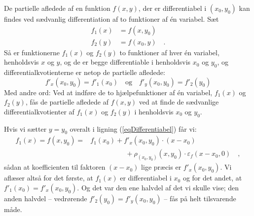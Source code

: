 \begin{theorem}
De partielle afledede af en funktion $f(x,y)$, der er differentiabel i $(x_{0}, y_{0})$ kan findes ved sædvanlig differentiation af to funktioner af \'{e}n variabel. Sæt
\begin{equation}
\begin{aligned}
f_{1}(x) &= f(x, y_{0}) \\
f_{2}(y) &= f(x_{0}, y) \quad.
\end{aligned}
\end{equation}
Så er funktionerne $f_{1}(x)$ og $f_{2}(y)$ to funktioner af hver \'{e}n variabel, henholdsvis $x$ og $y$, og de er begge differentiable i henholdsvis $x_{0}$ og $y_{0}$, og differentialkvotienterne er netop de partielle afledede:
\begin{equation}
f'_{x}(x_{0}, y_{0}) = f'_{1}(x_{0}) \quad \textrm{og} \quad f'_{y}(x_{0}, y_{0}) = f'_{2}(y_{0})
\end{equation}
Med andre ord: Ved at indføre de to hjælpefunktioner af \'{e}n variabel, $f_{1}(x)$ og $f_{2}(y)$, fås de partielle afledede af $f(x,y)$ ved at finde de sædvanlige differentialkvotienter af $f_{1}(x)$ og $f_{2}(y)$ i henholdsvis $x_{0}$ og $y_{0}$.
\end{theorem}
\begin{bevis}
Hvis vi sætter $y=y_{0}$ overalt i ligning (\ref{eqDifferentiabel}) får vi:
\begin{equation}
\begin{aligned}
f_{1}(x) = f(x,y_{0}) = &f_{1}(x_{0}) + f'_{x}(x_{0}, y_{0})\cdot (x-x_{0}) \\
&\phantom{f(x,y) =}+ \rho_{(x_{0}, y_{0})}(x,y_{0}) \cdot \varepsilon_{f}(x-x_{0},0) \quad ,
\end{aligned}
\end{equation}
sådan at koefficienten til faktoren $(x-x_{0})$ lige præcis er $f'_{x}(x_{0}, y_{0})$. Vi aflæser altså for det første, at $f_{1}(x)$ er differentiabel i $x_{0}$ og for det andet, at $ f'_{1}(x_{0}) = f'_{x}(x_{0}, y_{0})$. Og det var den ene halvdel af det vi skulle vise; den anden halvdel -- vedrørende $f'_{2}(y_{0}) = f'_{y}(x_{0}, y_{0})$ -- fås på helt tilsvarende måde.
\end{bevis}


